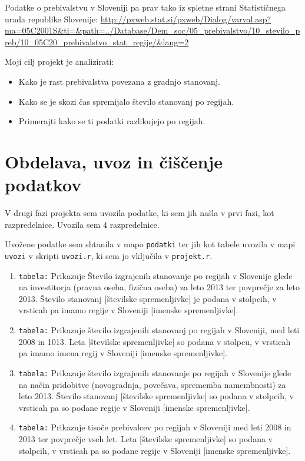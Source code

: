 \documentclass[11pt,a4paper]{article}
\begin{document}
Podatke o prebivalstvu v Sloveniji pa prav tako iz spletne strani Statističnega urada republike Slovenije:\newline
\url{http://pxweb.stat.si/pxweb/Dialog/varval.asp?ma=05C2001S&ti=&path=../Database/Dem_soc/05_prebivalstvo/10_stevilo_preb/10_05C20_prebivalstvo_stat_regije/&lang=2}
\newline

Moji cilj projekt je analizirati:
\begin{itemize}
\item{Kako je rast prebivalstva povezana z gradnjo stanovanj.} 
\item{Kako se je skozi čas spremijalo število stanovanj po regijah.} 
\item{Primerajti kako se ti podatki razlikujejo po regijah.}
\end{itemize}

\newpage
\section{Obdelava, uvoz in čiščenje podatkov}
V drugi fazi projekta sem uvozila podatke, ki sem jih našla v prvi fazi, kot razpredelnice. Uvozila sem 4 razpredelnice.
\newline

Uvožene podatke sem shtanila v mapo \verb|podatki| ter jih kot tabele uvozila v mapi \verb|uvozi| v skripti \verb|uvozi.r|, ki sem jo vključila v \verb|projekt.r|.

\begin{enumerate}
\item{\verb|tabela:| Prikazuje Število izgrajenih stanovanje po regijah v Slovenije glede na investitorja (pravna oseba, fizična oseba) za leto 2013 ter povprečje za leto 2013. Število stanovanj [številske spremenljivke] je podana v stolpcih, v vrsticah pa imamo regije v Sloveniji [imenske spremenljivke].}
\item{\verb|tabela:| Prikazuje število izgrajenih stanovanj po regijah v Sloveniji, med leti 2008 in 1013. Leta [številske spremenljivke] so podana v stolpcu, v vrsticah pa imamo imena regij v Sloveniji [imenske spremenljivke].}
\item{\verb|tabela:| Prikazuje število izgrajenih stanovanje po regijah v Slovenije glede na način pridobitve (novogradnja, povečava, sprememba namembnosti) za leto 2013. Število stanovanj [številske spremenljivke] so podana v stolpcih, v vrsticah pa so podane regije v Sloveniji [imenske spremenljivke].}
\item{\verb|tabela:| Prikazuje tisoče prebivalcev po regijah v Sloveniji med leti 2008 in 2013 ter povprečje vseh let. Leta [številske spremenljivke] so podana v stolpcih, v vrsticah pa so podane regije v Sloveniji [imenske spremenljivke].}
\end{enumerate}
\end{document}
